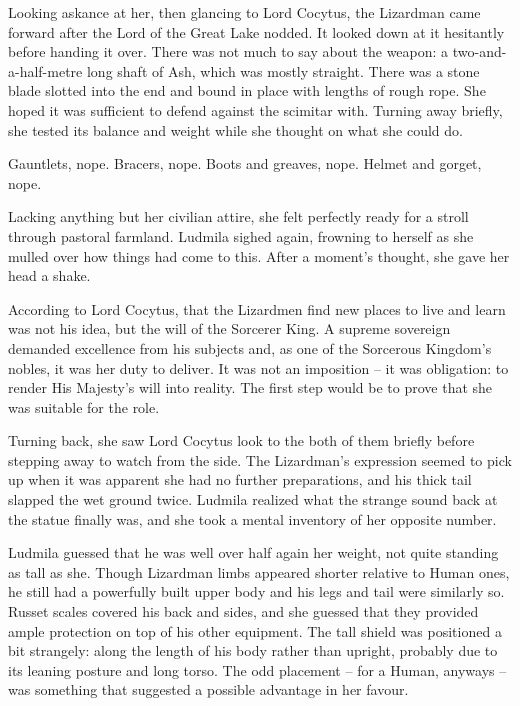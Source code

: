  

Looking askance at her, then glancing to Lord Cocytus, the Lizardman came forward after the Lord of the Great Lake nodded. It looked down at it hesitantly before handing it over. There was not much to say about the weapon: a two-and-a-half-metre long shaft of Ash, which was mostly straight. There was a stone blade slotted into the end and bound in place with lengths of rough rope. She hoped it was sufficient to defend against the scimitar with. Turning away briefly, she tested its balance and weight while she thought on what she could do.

 

Gauntlets, nope. Bracers, nope. Boots and greaves, nope. Helmet and gorget, nope.

 

Lacking anything but her civilian attire, she felt perfectly ready for a stroll through pastoral farmland. Ludmila sighed again, frowning to herself as she mulled over how things had come to this. After a moment’s thought, she gave her head a shake.

 

According to Lord Cocytus, that the Lizardmen find new places to live and learn was not his idea, but the will of the Sorcerer King. A supreme sovereign demanded excellence from his subjects and, as one of the Sorcerous Kingdom’s nobles, it was her duty to deliver. It was not an imposition – it was obligation: to render His Majesty’s will into reality. The first step would be to prove that she was suitable for the role.

 

Turning back, she saw Lord Cocytus look to the both of them briefly before stepping away to watch from the side. The Lizardman's expression seemed to pick up when it was apparent she had no further preparations, and his thick tail slapped the wet ground twice. Ludmila realized what the strange sound back at the statue finally was, and she took a mental inventory of her opposite number.

 

Ludmila guessed that he was well over half again her weight, not quite standing as tall as she. Though Lizardman limbs appeared shorter relative to Human ones, he still had a powerfully built upper body and his legs and tail were similarly so. Russet scales covered his back and sides, and she guessed that they provided ample protection on top of his other equipment. The tall shield was positioned a bit strangely: along the length of his body rather than upright, probably due to its leaning posture and long torso. The odd placement – for a Human, anyways – was something that suggested a possible advantage in her favour.

